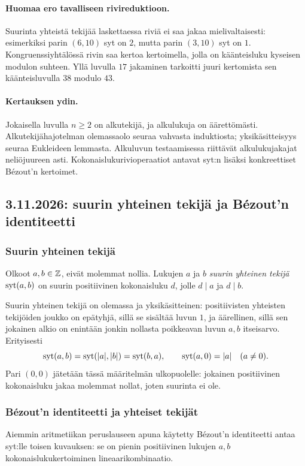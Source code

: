 \documentclass[11pt,a4paper]{amsart}
\begin{document}
\paragraph{Huomaa ero tavalliseen rivireduktioon.}
Suurinta yhteistä tekijää laskettaessa riviä ei saa jakaa mielivaltaisesti:
esimerkiksi parin $(6,10)$ syt on $2$, mutta parin $(3,10)$ syt on $1$.
Kongruenssiyhtälössä rivin saa kertoa kertoimella, jolla on käänteisluku
kyseisen modulon suhteen. Yllä luvulla $17$ jakaminen tarkoitti juuri
kertomista sen käänteisluvulla $38$ modulo $43$.

\paragraph{Kertauksen ydin.}
Jokaisella luvulla $n\ge2$ on alkutekijä, ja alkulukuja on äärettömästi.
Alkutekijähajotelman olemassaolo seuraa vahvasta induktiosta;
yksikäsitteisyys seuraa Eukleideen lemmasta. Alkuluvun testaamisessa
riittävät alkulukujakajat neliöjuureen asti. Kokonaislukurivioperaatiot
antavat syt:n lisäksi konkreettiset Bézout'n kertoimet.

\newpage
\subsection{3.11.2026: suurin yhteinen tekijä ja Bézout'n identiteetti}

\subsubsection{Suurin yhteinen tekijä}
\begin{definition}
  Olkoot $a,b\in\mathbb{Z}$, eivät molemmat nollia. Lukujen $a$ ja $b$
  \emph{suurin yhteinen tekijä} $\operatorname{syt}(a,b)$ on suurin positiivinen
  kokonaisluku $d$, jolle $d\mid a$ ja $d\mid b$.
\end{definition}
Suurin yhteinen tekijä on olemassa ja yksikäsitteinen: positiivisten
yhteisten tekijöiden joukko on epätyhjä, sillä se sisältää luvun $1$,
ja äärellinen, sillä sen jokainen alkio on enintään jonkin
nollasta poikkeavan luvun $a,b$ itseisarvo. Erityisesti
\[
  \operatorname{syt}(a,b)=\operatorname{syt}(|a|,|b|)=\operatorname{syt}(b,a),\qquad
  \operatorname{syt}(a,0)=|a|\quad(a\ne0).
\]
Pari $(0,0)$ jätetään tässä määritelmän ulkopuolelle: jokainen
positiivinen kokonaisluku jakaa molemmat nollat, joten suurinta ei ole.

\subsubsection{Bézout'n identiteetti ja yhteiset tekijät}
Aiemmin aritmetiikan peruslauseen apuna käytetty Bézout'n identiteetti
antaa syt:lle toisen kuvauksen: se on pienin positiivinen lukujen
$a,b$ kokonaislukukertoiminen lineaarikombinaatio.
\end{document}
